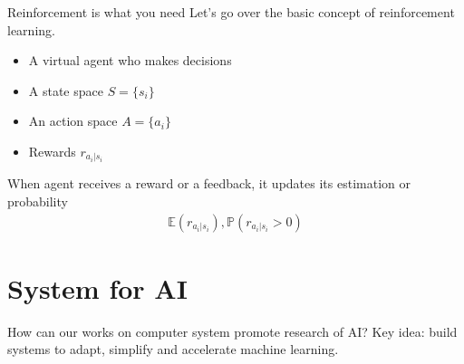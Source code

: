 \documentclass[UTF8]{ctexbeamer}
\begin{document}
\begin{frame}{Reinforcement is what you need}
  Let's go over the basic concept of reinforcement learning.
  \begin{itemize}
    \item <2-> A virtual agent who makes decisions
    \item <3-> A state space $S=\{s_i\}$
    \item <4-> An action space $A=\{a_i\}$
    \item <5-> Rewards $r_{a_i|s_i}$
  \end{itemize}
  When agent receives a reward or a feedback, it updates its estimation or probability \begin{align*}
    \mathbb{E} (r_{a_i|s_i}), \mathbb{P} (r_{a_i|s_i}>0)
  \end{align*}
\end{frame}

\section{System for AI}

\begin{frame}{How can our works on computer system promote research of AI?}
  Key idea: build systems to adapt, simplify and accelerate machine learning.
\end{frame}



\end{document}

